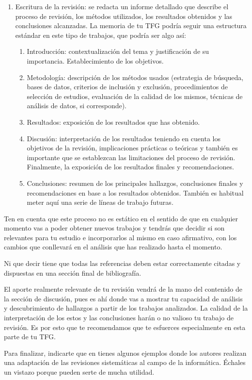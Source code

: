 \begin{enumerate}
\item Escritura de la revisión: se redacta un informe detallado que describe el proceso de revisión, los métodos utilizados, los resultados obtenidos y las conclusiones alcanzadas. La memoria de tu TFG podría seguir una estructura estándar en este tipo de trabajos, que podría ser algo así:

\begin{enumerate}
\item Introducción: contextualización del tema y justificación de su importancia. Establecimiento de los objetivos.
\item Metodología: descripción de los métodos usados (estrategia de búsqueda, bases de datos, criterios de inclusión y exclusión, procedimientos de selección de estudios,  evaluación de la calidad de los mismos, técnicas de análisis de datos, si corresponde).
\item Resultados: exposición de los resultados que has obtenido.
\item Discusión: interpretación de los resultados teniendo en cuenta los objetivos de la revisión, implicaciones prácticas o teóricas y también es importante que se establezcan las limitaciones del proceso de revisión. Finalmente, la exposición de los resultados finales y recomendaciones. 
\item Conclusiones: resumen de los principales hallazgos, conclusiones finales  y recomendaciones en base a los resultados obtenidos. También es habitual meter aquí una serie de líneas de trabajo futuras. 
\end{enumerate}
\end{enumerate}

Ten en cuenta que este proceso no es estático en el sentido de que en cualquier momento vas a poder obtener nuevos trabajos y tendrás que decidir si son relevantes para tu estudio e incorporarlos al mismo en caso afirmativo, con los cambios que conllevará en el análisis que has realizado hasta el momento.

Ni que decir tiene que todas las referencias deben estar correctamente citadas y dispuestas en una sección final de bibliografía.

El aporte realmente relevante de tu revisión vendrá de la mano del contenido de la sección de discusión, pues es ahí donde vas a mostrar tu capacidad de análisis y descubrimiento de hallazgos a partir de los trabajos analizados. La calidad de la interpretación de los estos y las conclusiones harán o no valioso tu trabajo de revisión. Es por esto que te recomendamos que te esfuerces especialmente en esta parte de tu TFG. 

Para finalizar, indicarte que en \cite{carrera2022angela, kofod2022anders,silva2016rodrigo} tienes algunos ejemplos donde los autores realizan una adaptación de las revisiones sistemáticas al campo de la informática. Échales un vistazo porque pueden serte de mucha utilidad.

